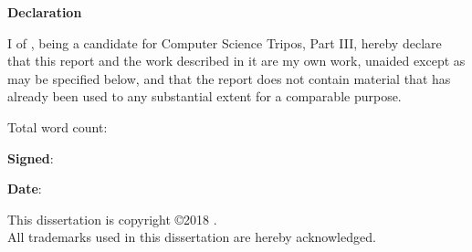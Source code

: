\newpage
{\normalfont\Huge\sffamily\bfseries Declaration}

\vspace{24pt} 

I \authorname of \authorcollege, being a candidate for Computer Science Tripos,
Part III, hereby declare that this report and the work described in it are my
own work, unaided except as may be specified below, and that the report does
not contain material that has already been used to any substantial extent for a
comparable purpose.

\vspace{24pt}
Total word count: \wordcount

\vspace{60pt}
\textbf{Signed}: 

\vspace{12pt}
\textbf{Date}:

\vfill

This dissertation is copyright \copyright 2018 \authorname. 
\\
All trademarks used in this dissertation are hereby acknowledged.

\newpage
\vspace*{\fill}
